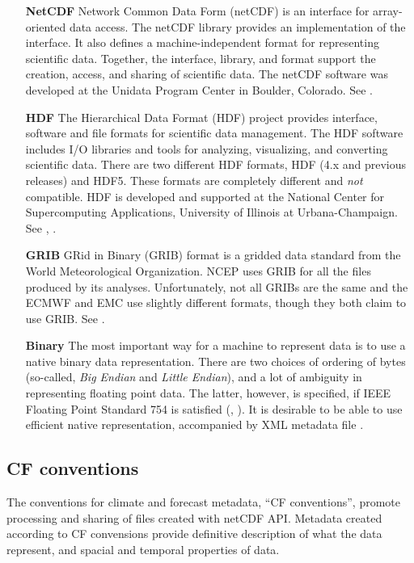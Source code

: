 \begin{itemize}
\item[\bf NetCDF] Network Common Data Form (netCDF) is an interface for 
array-oriented data access. The netCDF library provides an
implementation of the interface. It also defines a 
machine-independent format for representing scientific data. Together,
the interface, library, and format support the creation, access, and
sharing of scientific data. The netCDF software was developed at the
Unidata Program Center in Boulder, Colorado. See \cite{NetCDF3_UsersGuide_C}.

\item[\bf HDF] The Hierarchical Data Format (HDF) project provides
interface,  software and file formats for scientific data management. 
The HDF software includes I/O libraries and tools for analyzing,
visualizing, and converting scientific data. There are two different
HDF formats, HDF (4.x and previous releases) and HDF5. These formats
are completely different and {\it not} compatible. HDF is developed
and supported at the National Center for Supercomputing Applications,
University of Illinois at Urbana-Champaign. See
\cite{HDF4_tutorials}, \cite{HDF5_tutorial}.

\item[\bf GRIB] GRid in Binary (GRIB) format is a gridded data
standard from the World Meteorological Organization. NCEP uses GRIB
for all the files produced by its analyses. Unfortunately, not all
GRIBs are the same and the ECMWF and EMC use slightly different
formats, though they both claim to use GRIB. See \cite{GRIB_1}.


\item[\bf Binary]
The most important way for a machine to represent data is to use a
native binary data representation. There are  two choices of ordering of 
bytes (so-called, {\it Big Endian} and {\it Little Endian}), and a lot of
ambiguity in representing floating point data. The latter, however, is
specified, if IEEE Floating Point Standard 754 is satisfied 
(\cite{IEEE-Floating-Point}, \cite{Kahan-IEEE-754}). It is
desirable to be able to use efficient native representation,
accompanied by XML metadata file \cite{XML-W3C}. 
\end{itemize}

\subsection{CF conventions} 

The conventions for climate and forecast metadata, ``CF conventions'',
\cite{NetCDF_CF_v1_beta3} promote processing and sharing of files
created with netCDF API. Metadata created according to CF convensions
provide definitive description of what the data represent, and spacial
and temporal properties of data.

